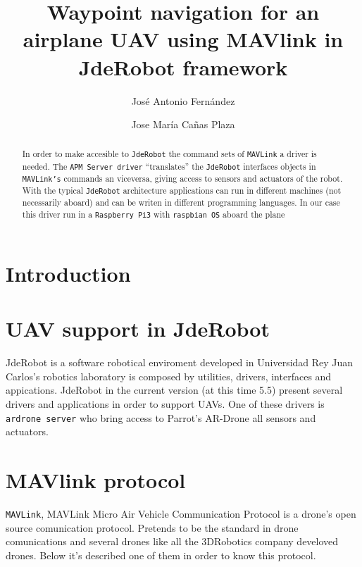 \documentclass{llncs}
\begin{document}
\title{Waypoint navigation for an airplane UAV using MAVlink in JdeRobot framework}
\author{José Antonio Fernández \and Jose María Cañas Plaza}
\maketitle

\begin{abstract}
In order to make accesible to \texttt{JdeRobot} the command sets of \texttt{MAVLink} a driver is needed. The \texttt{APM Server driver} ``translates'' the \texttt{JdeRobot} interfaces objects in \texttt{MAVLink's} commands an viceversa, giving access to sensors and actuators of the robot. With the typical \texttt{JdeRobot} architecture applications can run in different machines (not necessarily aboard) and can be writen in different programming languages. 
In our case this driver run in a \texttt{Raspberry Pi3} with \texttt{raspbian OS} aboard the plane
\end{abstract}

\section{Introduction}


\section{UAV support in JdeRobot}

JdeRobot is a software robotical enviroment developed in Universidad
Rey Juan Carlos's robotics laboratory is composed by utilities, drivers, interfaces and appications.
JdeRobot in the current version (at this time 5.5) present several drivers and applications in order to support UAVs.
One of these drivers is \texttt{ardrone server} who bring access to Parrot's AR-Drone all sensors and actuators. 


\section{MAVlink protocol}

\texttt{MAVLink}, MAVLink Micro Air Vehicle Communication Protocol is a drone's open source comunication protocol. Pretends to be the standard in drone comunications and several drones like all the 3DRobotics company develoved drones.
Below it's described one of them in order to know this protocol.
\end{document}
